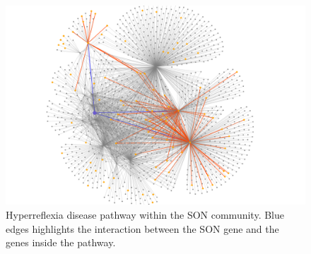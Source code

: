 \begin{figure}[H]
    \centering
    \includegraphics[width=0.8\linewidth]{images/plots/hyperreflexia_NO_SON.png}
    \caption{Hyperreflexia disease pathway within the SON community. Blue edges highlights the interaction between the SON gene and the genes inside the pathway.}
    \label{fig:hyperreflexia_NO_SON}
\end{figure}

